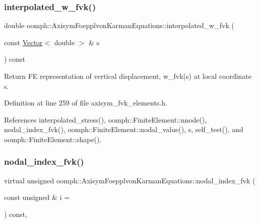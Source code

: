 \mbox{\label{classoomph_1_1AxisymFoepplvonKarmanEquations_aca5188335be3d0432fbf92d493026558}} 
\subsubsection{\texorpdfstring{interpolated\+\_\+w\+\_\+fvk()}{interpolated\_w\_fvk()}\hspace{0.1cm}{\footnotesize\ttfamily [2/2]}}
{\footnotesize\ttfamily double oomph\+::\+Axisym\+Foepplvon\+Karman\+Equations\+::interpolated\+\_\+w\+\_\+fvk (\begin{DoxyParamCaption}\item[{const \hyperlink{classoomph_1_1Vector}{Vector}$<$ double $>$ \&}]{s }\end{DoxyParamCaption}) const\hspace{0.3cm}{\ttfamily [inline]}}



Return FE representation of vertical displacement, w\+\_\+fvk(s) at local coordinate s. 



Definition at line 259 of file axisym\+\_\+fvk\+\_\+elements.\+h.



References interpolated\+\_\+stress(), oomph\+::\+Finite\+Element\+::nnode(), nodal\+\_\+index\+\_\+fvk(), oomph\+::\+Finite\+Element\+::nodal\+\_\+value(), s, self\+\_\+test(), and oomph\+::\+Finite\+Element\+::shape().

\mbox{\label{classoomph_1_1AxisymFoepplvonKarmanEquations_a481e2bbbd87723e7b91a79bcb83e361c}} 
\subsubsection{\texorpdfstring{nodal\+\_\+index\+\_\+fvk()}{nodal\_index\_fvk()}\hspace{0.1cm}{\footnotesize\ttfamily [1/2]}}
{\footnotesize\ttfamily virtual unsigned oomph\+::\+Axisym\+Foepplvon\+Karman\+Equations\+::nodal\+\_\+index\+\_\+fvk (\begin{DoxyParamCaption}\item[{const unsigned \&}]{i = {} }\end{DoxyParamCaption}) const\hspace{0.3cm}{\ttfamily [inline]}, {\ttfamily [virtual]}}



